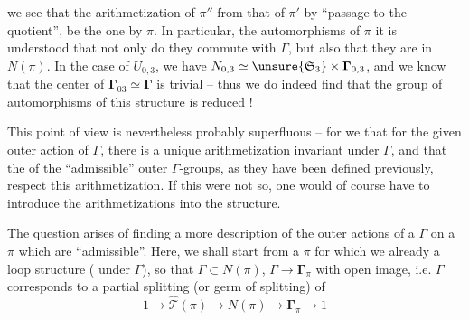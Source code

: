 
we see that the arithmetization of $\pi''$  from that of $\pi'$ by ``passage to the quotient'', be the one  by $\pi$.  In particular,  the automorphisms of $\pi$ it is understood that  not only do they commute with $\Gamma$, but also that they are in $N(\pi)$.  In the case of $U_{0,3}$, we have $N_{0,3}\simeq\unsure{\mathfrak S_3}\times\boldsymbol{\Gamma}_{0,3}$, and we know that the center of $\boldsymbol{\Gamma}_{03}\simeq\boldsymbol{\Gamma}$ is trivial -- thus we do indeed find that the group of automorphisms of this structure is reduced   !

This point of view is nevertheless probably superfluous -- for we  that for the given outer action of $\Gamma$, there is a unique arithmetization invariant under $\Gamma$, and that the   of the ``admissible'' outer $\Gamma$-groups, as they have been defined previously,  respect this arithmetization. If this were not so, one would of course have to introduce the arithmetizations into the structure.




The question arises of finding a more   description of the outer actions of a $\Gamma$ on a $\pi$ which are ``admissible''.  Here, we shall start from a $\pi$ for which we already  a loop structure  ( under $\Gamma$), so  that $\Gamma\subset N(\pi)$, $\Gamma\longrightarrow\boldsymbol{\Gamma}_\pi$  with open image,  i.e. $\Gamma$ corresponds to a partial splitting (or germ of splitting) of 
\[
1\longrightarrow\widehat{\mathcal T}(\pi)\longrightarrow N(\pi)\longrightarrow\boldsymbol{\Gamma}_\pi\longrightarrow1
\]

